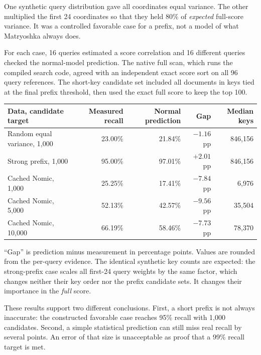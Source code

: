 One synthetic query distribution gave all coordinates equal variance. The other multiplied the
first 24 coordinates so that they held 80\% of \emph{expected} full-score variance. It was a
controlled favorable case for a prefix, not a model of what Matryoshka always does.

For each case, 16 queries estimated a score correlation and 16 different queries checked the
normal-model prediction. The native full scan, which runs the compiled search code, agreed with an independent exact score sort on
all 96 query references. The short-key candidate set included all documents in keys tied at
the final prefix threshold, then used the exact full score to keep the top 100.

\begin{center}\small
\begin{tabular}{@{}lrrrr@{}}\toprule
Data, candidate target & Measured recall & Normal prediction & Gap & Median keys\\\midrule
Random equal variance, 1,000 & 23.00\% & 21.84\% & $-1.16$ pp & 846,156\\
Strong prefix, 1,000 & 95.00\% & 97.01\% & $+2.01$ pp & 846,156\\
Cached Nomic, 1,000 & 25.25\% & 17.41\% & $-7.84$ pp & 6,976\\
Cached Nomic, 5,000 & 52.13\% & 42.57\% & $-9.56$ pp & 35,504\\
Cached Nomic, 10,000 & 66.19\% & 58.46\% & $-7.73$ pp & 78,370\\\bottomrule
\end{tabular}\normalsize\end{center}
``Gap'' is prediction minus measurement in percentage points. Values are rounded from the
per-query evidence. The identical synthetic key counts are expected: the strong-prefix case
scales all first-24 query weights by the same factor, which changes neither their key order nor
the prefix candidate sets. It changes their importance in the \emph{full} score.

These results support two different conclusions. First, a short prefix is not always
inaccurate: the constructed favorable case reaches 95\% recall with 1,000 candidates.
Second, a simple statistical prediction can still miss real recall by several points. An
error of that size is unacceptable as proof that a 99\% recall target is met.


